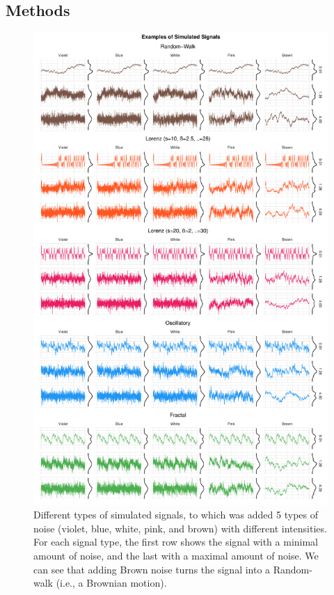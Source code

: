 \documentclass[
  man]{apa6}
\begin{document}
\hypertarget{methods}{%
\subsection{Methods}\label{methods}}

\begin{figure}
\centering
\includegraphics{manuscript_files/figure-latex/signals-1.pdf}
\caption{\label{fig:signals}Different types of simulated signals, to which was added 5 types of noise (violet, blue, white, pink, and brown) with different intensities. For each signal type, the first row shows the signal with a minimal amount of noise, and the last with a maximal amount of noise. We can see that adding Brown noise turns the signal into a Random-walk (i.e., a Brownian motion).}
\end{figure}
\end{document}
